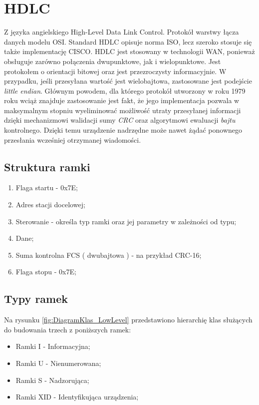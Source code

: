 \section{HDLC}
Z języka angielskiego High-Level Data Link Control. Protokół warstwy łącza danych modelu OSI. 
Standard HDLC opisuje norma ISO, lecz szeroko stosuje się także implementację CISCO.
HDLC jest stosowany w technologii WAN, ponieważ obsługuje zarówno połączenia dwupunktowe, jak i wielopunktowe. 
Jest protokołem o orientacji bitowej oraz jest przezroczysty informacyjnie\cite{WIKI_HDLC}.
W przypadku, jeśli przesyłana wartość jest wielobajtowa, zastosowane jest podejście \textit{little endian}.
Głównym powodem, dla którego protokół utworzony w roku 1979 roku wciąż znajduje zastosowanie jest fakt, że jego implementacja pozwala w maksymalnym stopniu
wyeliminować możliwość utraty przesyłanej informacji dzięki mechanizmowi walidacji sumy \textit{CRC} oraz algorytmowi ewaluacji \textit{bajtu} kontrolnego. Dzięki temu urządzenie nadrzędne może nawet żądać
ponownego przesłania wcześniej otrzymanej wiadomości.
\subsection{Struktura ramki}
\begin{enumerate}
    \item Flaga startu - 0x7E;
    \item Adres stacji docelowej;
    \item Sterowanie - określa typ ramki oraz jej parametry w zależności od typu;
    \item Dane;
    \item Suma kontrolna FCS ( dwubajtowa ) - na przykład CRC-16;
    \item Flaga stopu - 0x7E;
\end{enumerate}
\subsection{Typy ramek}
Na rysunku \ref{fig:DiagramKlas_LowLevel} przedstawiono hierarchię klas służących do budowania trzech z poniższych ramek:
\begin{itemize}
    \item Ramki I - Informacyjna;
    \item Ramki U - Nienumerowana;
    \item Ramki S - Nadzorująca;
    \item Ramki XID - Identyfikująca urządzenia;
\end{itemize}
